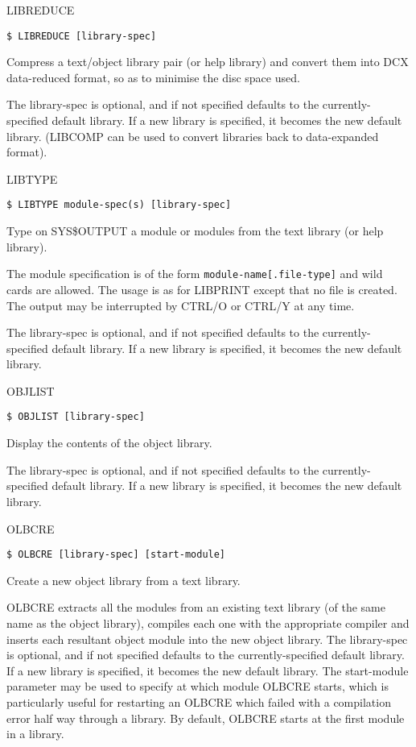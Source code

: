 \begin{list}{}{\setlength{\labelwidth}{\numlen}\setlength{\leftmargin}{\numlen}
\addtolength{\leftmargin}{\labelsep}}
\item[LIBREDUCE]
\begin{verbatim}
$ LIBREDUCE [library-spec]
\end{verbatim}
Compress a text/object library pair (or help library) and
convert them into DCX data-reduced format, so as to minimise the disc
space used.

The library-spec is optional, and if not specified defaults to the
currently-specified default library.
If a new library is specified, it becomes the new default library.
(LIBCOMP can be used to convert libraries back to data-expanded format).

\item[LIBTYPE]
\begin{verbatim}
$ LIBTYPE module-spec(s) [library-spec]
\end{verbatim}
Type on SYS\$OUTPUT a module or modules from the text
library (or help library).

The module specification is of the form {\tt module-name[.file-type]}
and wild cards are allowed.
The usage is as for LIBPRINT except that no file is created.
The output may be interrupted by CTRL/O or CTRL/Y at any
time.

The library-spec is optional, and if not specified defaults to the
currently-specified default library.
If a new library is specified, it becomes the new default library.

\item[OBJLIST]
\begin{verbatim}
$ OBJLIST [library-spec]
\end{verbatim}
Display the contents of the object library.

The library-spec is optional, and if not specified defaults to the
currently-specified default library.
If a new library is specified, it becomes the new default library.

\item[OLBCRE]
\begin{verbatim}
$ OLBCRE [library-spec] [start-module]
\end{verbatim}
Create a new object library from a text library.

OLBCRE extracts all the modules from an existing text library (of the
same name as the object library), compiles each one with the appropriate
compiler and inserts each resultant object module into the new object
library.
The library-spec is optional, and if not specified defaults to the
currently-specified default library.
If a new library is specified, it becomes the new default library.
The start-module parameter may be used to specify at which module OLBCRE
starts, which is particularly useful for restarting an OLBCRE which
failed with a compilation error half way through a library.
By default, OLBCRE starts at the first module in a library.


\end{list}
